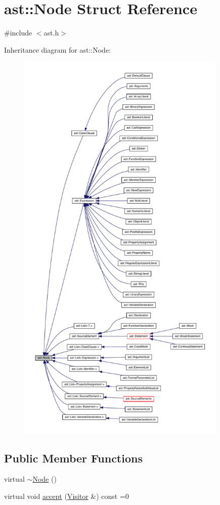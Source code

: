 \hypertarget{structast_1_1_node}{}\section{ast\+:\+:Node Struct Reference}
\label{structast_1_1_node}


{\ttfamily \#include $<$ast.\+h$>$}



Inheritance diagram for ast\+:\+:Node\+:
\nopagebreak
\begin{figure}[H]
\begin{center}
\leavevmode
\includegraphics[height=550pt]{structast_1_1_node__inherit__graph}
\end{center}
\end{figure}
\subsection*{Public Member Functions}
\begin{DoxyCompactItemize}
\item 
virtual \hyperlink{structast_1_1_node_a178b5135f3dc18803c2e5997ce251738}{$\sim$\+Node} ()
\item 
virtual void \hyperlink{structast_1_1_node_abc089ee6caaf06a4445ebdd8391fdebc}{accept} (\hyperlink{structast_1_1_visitor}{Visitor} \&) const =0
\end{DoxyCompactItemize}


